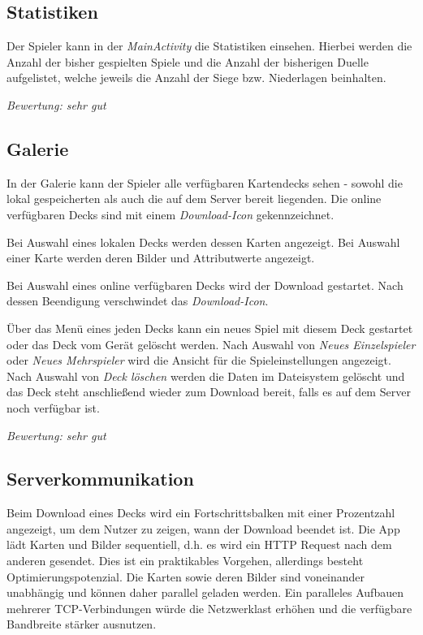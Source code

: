 \subsection{Statistiken}

Der Spieler kann in der \emph{MainActivity} die Statistiken einsehen. Hierbei werden die Anzahl der bisher gespielten Spiele und die Anzahl der bisherigen Duelle aufgelistet, welche jeweils die Anzahl der Siege bzw. Niederlagen beinhalten.

\vspace{5mm}
\emph{Bewertung: sehr gut}
\vspace{5mm}

\subsection{Galerie}

In der Galerie kann der Spieler alle verfügbaren Kartendecks sehen - sowohl die lokal gespeicherten als auch die auf dem Server bereit liegenden. Die online verfügbaren Decks sind mit einem \emph{Download-Icon} gekennzeichnet.

Bei Auswahl eines lokalen Decks werden dessen Karten angezeigt. Bei Auswahl einer Karte werden deren Bilder und Attributwerte angezeigt.

Bei Auswahl eines online verfügbaren Decks wird der Download gestartet. Nach dessen Beendigung verschwindet das \emph{Download-Icon}.

Über das Menü eines jeden Decks kann ein neues Spiel mit diesem Deck gestartet oder das Deck vom Gerät gelöscht werden. Nach Auswahl von \emph{Neues Einzelspieler} oder \emph{Neues Mehrspieler} wird die Ansicht für die Spieleinstellungen angezeigt. Nach Auswahl von \emph{Deck löschen} werden die Daten im Dateisystem gelöscht und das Deck steht anschließend wieder zum Download bereit, falls es auf dem Server noch verfügbar ist.

\vspace{5mm}
\emph{Bewertung: sehr gut}
\vspace{5mm}

\subsection{Serverkommunikation}

Beim Download eines Decks wird ein Fortschrittsbalken mit einer Prozentzahl angezeigt, um dem Nutzer zu zeigen, wann der Download beendet ist. Die App lädt Karten und Bilder sequentiell, d.h. es wird ein HTTP Request nach dem anderen gesendet. Dies ist ein praktikables Vorgehen, allerdings besteht Optimierungspotenzial. Die Karten sowie deren Bilder sind voneinander unabhängig und können daher parallel geladen werden. Ein paralleles Aufbauen mehrerer TCP-Verbindungen würde die Netzwerklast erhöhen und die verfügbare Bandbreite stärker ausnutzen.

